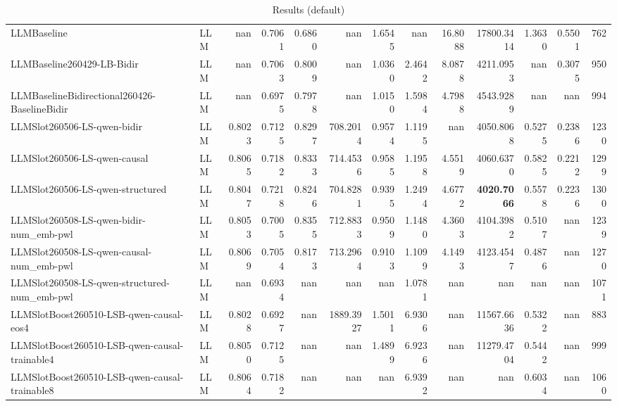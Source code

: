 \begin{table}[htbp]
{\begin{tabular}{ll|rrrrrrrrrr|r}
LLMBaseline & LLM & nan & 0.7061 & 0.6860 & nan & 1.6545 & nan & 16.8088 & 17800.3414 & 1.3630 & 0.5501 & 762 \\
LLMBaseline260429-LB-Bidir & LLM & nan & 0.7063 & 0.8009 & nan & 1.0360 & 2.4642 & 8.0878 & 4211.0953 & nan & 0.3075 & 950 \\
LLMBaselineBidirectional260426-BaselineBidir & LLM & nan & 0.6975 & 0.7978 & nan & 1.0150 & 1.5984 & 4.7988 & 4543.9289 & nan & nan & 994 \\
LLMSlot260506-LS-qwen-bidir & LLM & 0.8023 & 0.7125 & 0.8297 & 708.2014 & 0.9574 & 1.1195 & nan & 4050.8068 & 0.5275 & 0.2386 & 1230 \\
LLMSlot260506-LS-qwen-causal & LLM & 0.8065 & 0.7182 & 0.8333 & 714.4536 & 0.9585 & 1.1958 & 4.5519 & 4060.6370 & 0.5825 & 0.2212 & 1299 \\
LLMSlot260506-LS-qwen-structured & LLM & 0.8047 & 0.7218 & 0.8246 & 704.8281 & 0.9395 & 1.2494 & 4.6772 & \textbf{4020.7066} & 0.5578 & 0.2236 & 1300 \\
LLMSlot260508-LS-qwen-bidir-num\_emb-pwl & LLM & 0.8053 & 0.7005 & 0.8355 & 712.8833 & 0.9509 & 1.1480 & 4.3603 & 4104.3982 & 0.5107 & nan & 1239 \\
LLMSlot260508-LS-qwen-causal-num\_emb-pwl & LLM & 0.8069 & 0.7054 & 0.8173 & 713.2964 & 0.9103 & 1.1099 & 4.1493 & 4123.4547 & 0.4876 & nan & 1270 \\
LLMSlot260508-LS-qwen-structured-num\_emb-pwl & LLM & nan & 0.6934 & nan & nan & nan & 1.0781 & nan & nan & nan & nan & 1071 \\
LLMSlotBoost260510-LSB-qwen-causal-eos4 & LLM & 0.8028 & 0.6927 & nan & 1889.3927 & 1.5011 & 6.9306 & nan & 11567.6636 & 0.5322 & nan & 883 \\
LLMSlotBoost260510-LSB-qwen-causal-trainable4 & LLM & 0.8050 & 0.7125 & nan & nan & 1.4899 & 6.9236 & nan & 11279.4704 & 0.5442 & nan & 999 \\
LLMSlotBoost260510-LSB-qwen-causal-trainable8 & LLM & 0.8064 & 0.7182 & nan & nan & nan & 6.9392 & nan & nan & 0.6034 & nan & 1060 \\
\bottomrule
\end{tabular}
}
\caption{Results (default)}
\label{tab:results_default}
\end{table}